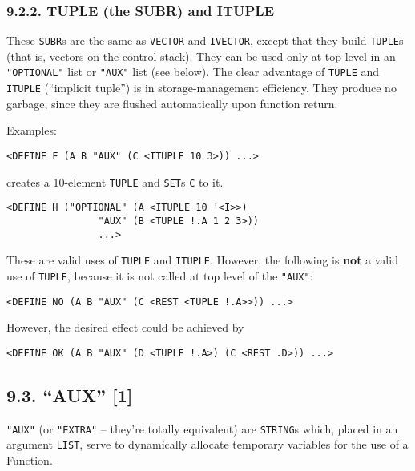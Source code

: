 \documentclass[a4paper,]{article}
\begin{document}
\subsubsection{9.2.2. TUPLE (the SUBR) and ITUPLE}\label{tuple-the-subr-and-ituple}

These \texttt{SUBR}s are the same as \texttt{VECTOR} and \texttt{IVECTOR}, except that they build
\texttt{TUPLE}s (that is, vectors on the control stack). They can be used only at top level in
an \texttt{"OPTIONAL"} list or \texttt{"AUX"} list (see below). The clear advantage of \texttt{TUPLE} and
\texttt{ITUPLE} (``implicit tuple'') is in storage-management efficiency. They produce no
garbage, since they are flushed automatically upon function return.

Examples:

\begin{verbatim}
<DEFINE F (A B "AUX" (C <ITUPLE 10 3>)) ...>
\end{verbatim}

creates a 10-element \texttt{TUPLE} and \texttt{SET}s \texttt{C} to it.

\begin{verbatim}
<DEFINE H ("OPTIONAL" (A <ITUPLE 10 '<I>>)
                "AUX" (B <TUPLE !.A 1 2 3>))
                ...>
\end{verbatim}

These are valid uses of \texttt{TUPLE} and \texttt{ITUPLE}. However, the following is \textbf{not} a valid use of
\texttt{TUPLE}, because it is not called at top level of the \texttt{"AUX"}:

\begin{verbatim}
<DEFINE NO (A B "AUX" (C <REST <TUPLE !.A>>)) ...>
\end{verbatim}

However, the desired effect could be achieved by

\begin{verbatim}
<DEFINE OK (A B "AUX" (D <TUPLE !.A>) (C <REST .D>)) ...>
\end{verbatim}

\subsection{\texorpdfstring{9.3. ``AUX'' {[}1{]}}{9.3. AUX {[}1{]}}}\label{aux-1}

\texttt{"AUX"}  (or \texttt{"EXTRA"}  -- they're totally
equivalent) are \texttt{STRING}s which, placed in an argument \texttt{LIST}, serve to dynamically allocate temporary
variables for the use of a Function.
\end{document}
